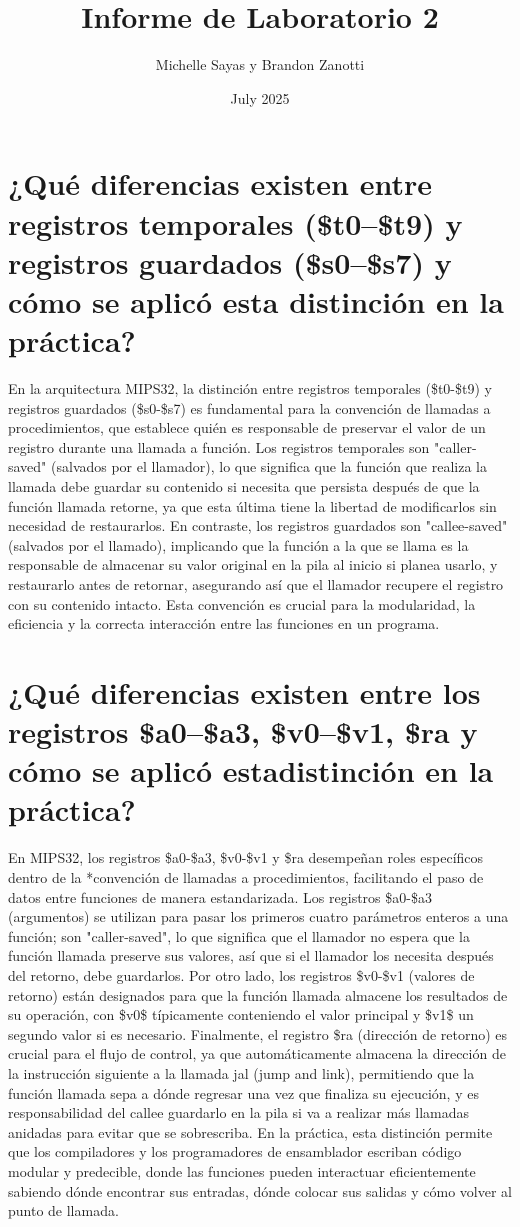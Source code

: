 \documentclass{article}
\title{Informe de Laboratorio 2}
\author{Michelle Sayas y Brandon Zanotti}
\date{July 2025}
\begin{document}
\maketitle
\section{¿Qué diferencias existen entre registros temporales (\$t0–\$t9) y registros guardados (\$s0–\$s7) y cómo se aplicó esta distinción en la práctica?}
En la arquitectura MIPS32, la distinción entre registros temporales (\$t0-\$t9) y registros guardados (\$s0-\$s7) es fundamental para la convención de llamadas a procedimientos, que establece quién es responsable de preservar el valor de un registro durante una llamada a función. Los registros temporales son "caller-saved" (salvados por el llamador), lo que significa que la función que realiza la llamada debe guardar su contenido si necesita que persista después de que la función llamada retorne, ya que esta última tiene la libertad de modificarlos sin necesidad de restaurarlos. En contraste, los registros guardados son "callee-saved" (salvados por el llamado), implicando que la función a la que se llama es la responsable de almacenar su valor original en la pila al inicio si planea usarlo, y restaurarlo antes de retornar, asegurando así que el llamador recupere el registro con su contenido intacto. Esta convención es crucial para la modularidad, la eficiencia y la correcta interacción entre las funciones en un programa.
\section{¿Qué diferencias existen entre los registros \$a0–\$a3, \$v0–\$v1, \$ra y cómo se aplicó estadistinción en la práctica?}
En MIPS32, los registros \$a0-\$a3, \$v0-\$v1 y \$ra desempeñan roles específicos dentro de la *convención de llamadas a procedimientos, facilitando el paso de datos entre funciones de manera estandarizada. Los registros \$a0-\$a3 (argumentos) se utilizan para pasar los primeros cuatro parámetros enteros a una función; son "caller-saved", lo que significa que el llamador no espera que la función llamada preserve sus valores, así que si el llamador los necesita después del retorno, debe guardarlos. Por otro lado, los registros \$v0-\$v1 (valores de retorno) están designados para que la función llamada almacene los resultados de su operación, con \$v0\$ típicamente conteniendo el valor principal y \$v1\$ un segundo valor si es necesario. Finalmente, el registro \$ra (dirección de retorno) es crucial para el flujo de control, ya que automáticamente almacena la dirección de la instrucción siguiente a la llamada jal (jump and link), permitiendo que la función llamada sepa a dónde regresar una vez que finaliza su ejecución, y es responsabilidad del callee guardarlo en la pila si va a realizar más llamadas anidadas para evitar que se sobrescriba. En la práctica, esta distinción permite que los compiladores y los programadores de ensamblador escriban código modular y predecible, donde las funciones pueden interactuar eficientemente sabiendo dónde encontrar sus entradas, dónde colocar sus salidas y cómo volver al punto de llamada.
\end{document}
